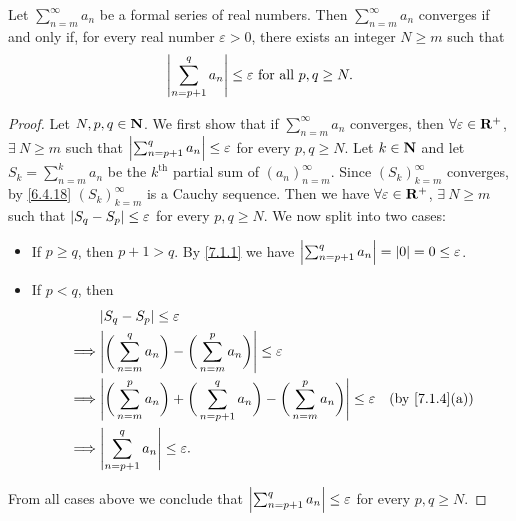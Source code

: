 \setcounter{theorem}{4}
\begin{proposition}\label{7.2.5}
  Let \(\sum_{n = m}^\infty a_n\) be a formal series of real numbers.
  Then \(\sum_{n = m}^\infty a_n\) converges if and only if, for every real number \(\varepsilon > 0\), there exists an integer \(N \geq m\) such that
  \[
    \left\lvert\sum_{n = p + 1}^q a_n\right\rvert \leq \varepsilon \text{ for all } p, q \geq N.
  \]
\end{proposition}

\begin{proof}
  Let \(N, p, q \in \mathbf{N}\).
  We first show that if \(\sum_{n = m}^\infty a_n\) converges, then \(\forall \varepsilon \in \mathbf{R}^+\), \(\exists\ N \geq m\) such that \(\left\lvert\sum_{n = p + 1}^q a_n\right\rvert \leq \varepsilon\) for every \(p, q \geq N\).
  Let \(k \in \mathbf{N}\) and let \(S_k = \sum_{n = m}^k a_n\) be the \(k^{\text{th}}\) partial sum of \((a_n)_{n = m}^\infty\).
  Since \((S_k)_{k = m}^\infty\) converges, by \cref{6.4.18} \((S_k)_{k = m}^\infty\) is a Cauchy sequence.
  Then we have \(\forall \varepsilon \in \mathbf{R}^+\), \(\exists\ N \geq m\) such that \(\left\lvert S_q - S_p\right\rvert \leq \varepsilon\) for every \(p, q \geq N\).
  We now split into two cases:
  \begin{itemize}
    \item If \(p \geq q\), then \(p + 1 > q\).
          By \cref{7.1.1} we have \(\left\lvert\sum_{n = p + 1}^q a_n\right\rvert = \left\lvert0\right\rvert = 0 \leq \varepsilon\).
    \item If \(p < q\), then
          \begin{align*}
                     & \abs{S_q - S_p} \leq \varepsilon                                                                                                                          \\
            \implies & \abs{\bigg(\sum_{n = m}^q a_n\bigg) - \bigg(\sum_{n = m}^p a_n\bigg)} \leq \varepsilon                                                                    \\
            \implies & \abs{\bigg(\sum_{n = m}^p a_n\bigg) + \bigg(\sum_{n = p + 1}^q a_n\bigg) - \bigg(\sum_{n = m}^p a_n\bigg)} \leq \varepsilon & \text{(by \cref{7.1.4}(a))} \\
            \implies & \abs{\sum_{n = p + 1}^q a_n} \leq \varepsilon.
          \end{align*}
  \end{itemize}
  From all cases above we conclude that \(\left\lvert\sum_{n = p + 1}^q a_n\right\rvert \leq \varepsilon\) for every \(p, q \geq N\).


\end{proof}

